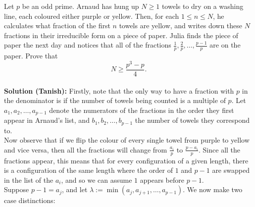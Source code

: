 Let $p$ be an odd prime. Arnaud has hung up $N\geq 1$ towels to dry on a washing line, each coloured either purple or yellow. Then, for each $1 \leq n \leq N$, he calculates what fraction of the first $n$ towels are yellow, and writes down these $N$ fractions in their irreducible form on a piece of paper. Julia finds the piece of paper the next day and notices that all of the fractions $\frac{1}{p}, \frac{2}{p}, \dots, \frac{p-1}{p}$ are on the paper. Prove that 
\[
N \geq \frac{p^3-p}{4}.
\]
\bigskip
\\
\textbf{Solution (Tanish):} Firstly, note that the only way to have a fraction with $p$ in the denominator is if the number of towels being counted is a multiple of $p$. Let $a_1, a_2, \dots, a_{p-1}$ denote the numerators of the fractions in the order they first appear in Arnaud's list, and $b_1, b_2, \dots, b_{p-1}$ the number of towels they correspond to. \\
Now observe that if we flip the colour of every single towel from purple to yellow and vice versa, then all the fractions will change from $\frac{a_i}{p}$ to $\frac{p-a_i}{p}$. Since all the fractions appear, this means that for every configuration of a given length, there is a configuration of the same length where the order of $1$ and $p-1$ are swapped in the list of the $a_i$, and so we can assume $1$ appears before $p-1$. \\
Suppose $p-1 = a_j$, and let $\lambda := \min(a_j, a_{j+1}, \dots, a_{p-1})$. We now make two case distinctions:
